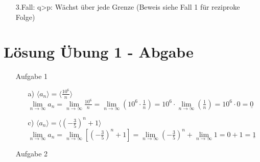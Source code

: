 \documentclass{scrreprt}
\begin{document}
\begin{enumerate}
{\begin{enumerate}
{\begin{enumerate}
                        \item [3.Fall:] q>p: Wächst über jede Grenze (Beweis siehe Fall 1 für reziproke Folge)
                    \end{enumerate}
                }
            \end{enumerate}
        }
    \end{enumerate}

    \newpage
    \setcounter{page}{1}

    \section*{Lösung Übung 1 - Abgabe}
    \begin{enumerate}
        \item[Aufgabe 1] {
            \begin{enumerate}
                \item[a)]{
                    $\langle a_n \rangle = \langle \frac{10^6}{n}\rangle$\newline
                    $\lim \limits_{n \to \infty} a_n =
                    \lim \limits_{n \to \infty} \frac{10^6}{n} =
                    \lim \limits_{n \to \infty} (10^6 \cdot \frac{1}{n} ) =
                    10^6 \cdot \lim \limits_{n \to \infty} (\frac{1}{n}) =
                    10^6 \cdot 0 = \underline{0}$
                }
                \item[c)]{
                    $\langle a_n \rangle =\langle (-\frac{3}{5})^n + 1\rangle$\newline
                    $\lim \limits_{n \to \infty} a_n =
                    \lim \limits_{n \to \infty} [(-\frac{3}{5})^n + 1] =
                    \lim \limits_{n \to \infty} (-\frac{3}{5})^n + \lim \limits_{n \to \infty} 1 =
                    0 + 1 = \underline{1}$
                }
            \end{enumerate}
        }
        \item[Aufgabe 2] {
            }
\end{enumerate}
\end{document}
